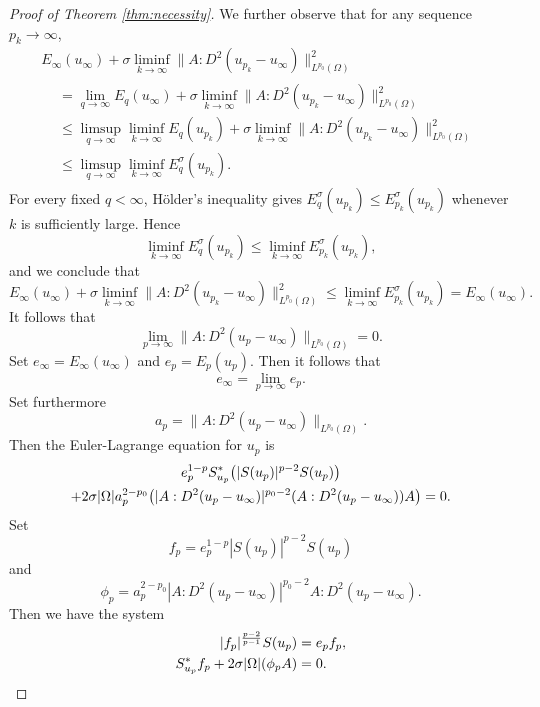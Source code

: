 \documentclass[a4paper]{article}
\let\div\relax\DeclareMathOperator{\div}{div}
\theoremstyle{remark}
\begin{document}
\begin{proof}[Proof of Theorem \ref{thm:necessity}]
We further observe that for any sequence $p_k \to \infty$,
\begin{multline*}
E_\infty(u_\infty) + \sigma \liminf_{k \to \infty} \|A : D^2(u_{p_k} - u_\infty)\|_{L^{p_0}(\Omega)}^2 \\
\begin{aligned}
& = \lim_{q \to \infty} E_q(u_\infty) + \sigma \liminf_{k \to \infty} \|A : D^2(u_{p_k} - u_\infty)\|_{L^{p_0}(\Omega)}^2 \\
& \le \limsup_{q \to \infty} \liminf_{k \to \infty} E_q(u_{p_k}) + \sigma \liminf_{k \to \infty} \|A : D^2(u_{p_k} - u_\infty)\|_{L^{p_0}(\Omega)}^2 \\
& \le \limsup_{q \to \infty} \liminf_{k \to \infty} E_q^\sigma(u_{p_k}).
\end{aligned}
\end{multline*}
For every fixed $q < \infty$, H\"older's inequality gives
$E_q^\sigma(u_{p_k}) \le E_{p_k}^\sigma(u_{p_k})$ whenever $k$ is sufficiently large. Hence
\[
\liminf_{k \to \infty} E_q^\sigma(u_{p_k}) \le \liminf_{k \to \infty} E_{p_k}^\sigma(u_{p_k}),
\]
and we conclude that
\[
E_\infty(u_\infty) + \sigma \liminf_{k \to \infty} \|A : D^2(u_{p_k} - u_\infty)\|_{L^{p_0}(\Omega)}^2 \le \liminf_{k \to \infty} E_{p_k}^\sigma(u_{p_k}) = E_\infty(u_\infty).
\]
It follows that
\[
\lim_{p \to \infty} \|A : D^2(u_p - u_\infty)\|_{L^{p_0}(\Omega)} = 0.
\]
Set $e_\infty = E_\infty(u_\infty)$ and $e_p = E_p(u_p)$. Then it follows that
\[
e_\infty = \lim_{p \to \infty} e_p.
\]
Set furthermore
\[
a_p = \|A : D^2(u_p - u_\infty)\|_{L^{p_0}(\Omega)}.
\]
Then the Euler-Lagrange equation for $u_p$ is
\begin{multline*}
e_p^{1 - p} S_{u_p}^* \bigl(|S(u_p)|^{p - 2} S(u_p)\bigr) \\
+ 2\sigma |\Omega| a_p^{2 - p_0} \div \div\bigl(|A : D^2(u_p - u_\infty)|^{p_0 - 2} (A : D^2(u_p - u_\infty)) A\bigr) = 0.
\end{multline*}
Set
\[
f_p = e_p^{1 - p} |S(u_p)|^{p - 2} S(u_p)
\]
and
\[
\phi_p = a_p^{2 - p_0} |A : D^2(u_p - u_\infty)|^{p_0 - 2} A : D^2(u_p - u_\infty).
\]
Then we have the system
\begin{align}
|f_p|^{\frac{p - 2}{p - 1}} S(u_p)  & = e_p f_p, \label{eqn:Euler-Lagrange_p1} \\
S_{u_p}^* f_p + 2\sigma |\Omega| \div \div (\phi_p A) & = 0. \label{eqn:Euler-Lagrange_p2}
\end{align}


\end{proof}
\end{document}
